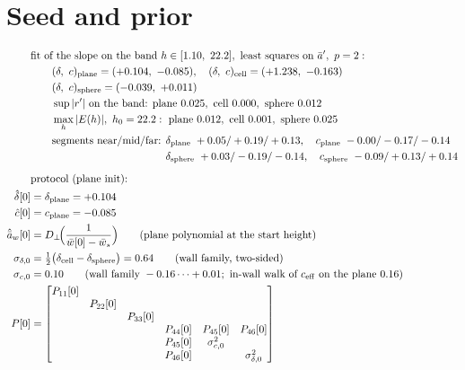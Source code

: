 \documentclass[11pt,a4paper,fontset=none]{ctexart}
\newcommand{\ba}{\bar{a}}
\newcommand{\bw}{\bar{w}}
\newcommand{\ap}{\ba'}
\newcommand{\ah}{\hat{\ba}_w}
\newcommand{\ch}{\hat{c}}
\newcommand{\dl}{\delta}
\newcommand{\dlh}{\hat{\delta}}
\newcommand{\Dp}{D_{\perp}}
\begin{document}
\section*{Seed and prior}

\begin{align*}
&\text{fit of the slope on the band } h \in [1.10,\ 22.2],\ \text{least squares on } \ap,\ p = 2: \\
&\qquad (\dl,\ c)_{\mathrm{plane}} = (+0.104,\ -0.085),\quad (\dl,\ c)_{\mathrm{cell}} = (+1.238,\ -0.163) \\
&\qquad (\dl,\ c)_{\mathrm{sphere}} = (-0.039,\ +0.011) \\
&\qquad \sup|r'| \text{ on the band: plane } 0.025,\ \text{cell } 0.000,\ \text{sphere } 0.012 \\
&\qquad \max_h |E(h)|,\ h_0 = 22.2: \text{ plane } 0.012,\ \text{cell } 0.001,\ \text{sphere } 0.025 \\
&\qquad \text{segments near/mid/far: } \dl_{\mathrm{plane}}\ +0.05/+0.19/+0.13,\quad c_{\mathrm{plane}}\ -0.00/-0.17/-0.14 \\
&\qquad\phantom{\text{segments near/mid/far: }} \dl_{\mathrm{sphere}}\ +0.03/-0.19/-0.14,\quad c_{\mathrm{sphere}}\ -0.09/+0.13/+0.14 \\[6pt]
&\text{protocol (plane init):} \\
\dlh[0] &= \dl_{\mathrm{plane}} = +0.104 \\
\ch[0]  &= c_{\mathrm{plane}} = -0.085 \\
\ah[0]  &= \Dp\!\Bigl(\frac{1}{\bw[0] - \bw_s}\Bigr) \qquad(\text{plane polynomial at the start height}) \\
\sigma_{\dl,0} &= \tfrac{1}{2}\bigl(\dl_{\mathrm{cell}} - \dl_{\mathrm{sphere}}\bigr) = 0.64 \qquad(\text{wall family, two-sided}) \\
\sigma_{c,0}   &= 0.10 \qquad(\text{wall family } -0.16\dots+0.01;\ \text{in-wall walk of } c_{\mathrm{eff}} \text{ on the plane } 0.16) \\
P[0]   &= \begin{bmatrix} P_{11}[0] & & & & & \\ & P_{22}[0] & & & & \\ & & P_{33}[0] & & & \\
          & & & P_{44}[0] & P_{45}[0] & P_{46}[0] \\ & & & P_{45}[0] & \sigma_{c,0}^{2} & \\ & & & P_{46}[0] & & \sigma_{\dl,0}^{2} \end{bmatrix} \\

\end{align*}
\end{document}

